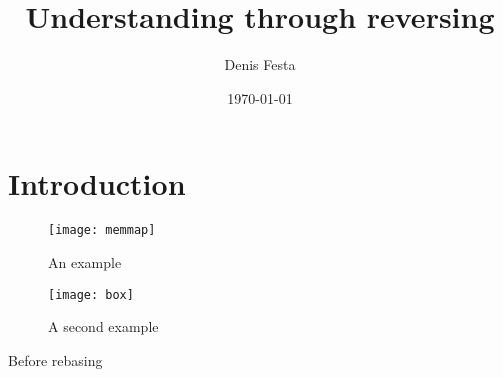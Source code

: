 \documentclass{article}
\begin{document}
\title{Understanding through reversing}
\author{Denis Festa}
\date{\today}

\maketitle

\tableofcontents

\section{Introduction}
%
%
\begin{figure}[ht]
	\centering
	\texttt{[image: memmap]}
	\caption{An example}
	\label{fig:exmemmap}
\end{figure}

\begin{figure}[ht]
	\centering
	\texttt{[image: box]}
	\caption{A second example}
	\label{fig:exmemmap2}
\end{figure}

Before rebasing
\end{document}
